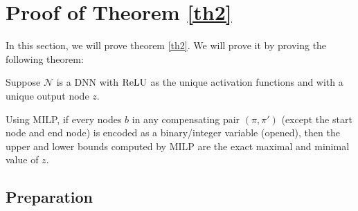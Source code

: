 			
			
			\section{Proof of Theorem \ref{th2}}
			
			In this section, we will prove theorem \ref{th2}. We will prove it by proving the following theorem:
			
			\begin{theorem} \label{thm:2}
				
				
				Suppose $\mathcal{N}$ is a DNN with $\mathrm{ReLU}$ as the unique activation functions and with a unique output node $z$.
				
				Using MILP, if every nodes $b$ in any compensating pair
				$(\pi,\pi')$ (except the start node and end node) is encoded as a binary/integer variable (opened), then the upper and lower 
				bounds computed by MILP are the exact maximal and minimal value of $z$.
			\end{theorem}
			
			
			\subsection{Preparation}
			
